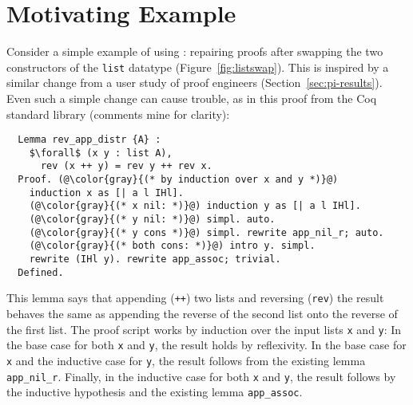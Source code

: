 \section{Motivating Example}
\label{sec:overview}

\begin{figure*}
\begin{minipage}{0.50\textwidth}
   
\end{minipage}
\hfill
\begin{minipage}{0.49\textwidth}
   
\end{minipage}
\caption{A change from the old version (left) to the new version (right) of \lstinline{list}.
Recall that \lstinline{list} is an inductive datatype that is either empty (the \lstinline{nil} constructor), or the result
of placing an element in front of another \lstinline{list} (the \lstinline{cons} constructor). The change swaps these
constructors ().}
\label{fig:listswap}
\end{figure*}

Consider a simple example of using \toolnamec: repairing proofs after swapping the two constructors of the \lstinline{list} datatype (Figure~\ref{fig:listswap}).
This is inspired by a similar change from a user study of proof engineers (Section~\ref{sec:pi-results}).
Even such a simple change can cause trouble, as in this proof from the Coq standard library (comments mine for clarity):

\begin{lstlisting}
  Lemma rev_app_distr {A} :
    $\forall$ (x y : list A),
      rev (x ++ y) = rev y ++ rev x.
  Proof. (@\color{gray}{(* by induction over x and y *)}@)
    induction x as [| a l IHl].
    (@\color{gray}{(* x nil: *)}@) induction y as [| a l IHl].
    (@\color{gray}{(* y nil: *)}@) simpl. auto.
    (@\color{gray}{(* y cons *)}@) simpl. rewrite app_nil_r; auto.
    (@\color{gray}{(* both cons: *)}@) intro y. simpl.
    rewrite (IHl y). rewrite app_assoc; trivial.
  Defined.
\end{lstlisting}
This lemma says that appending (\lstinline{++}) two lists and reversing (\lstinline{rev}) the result behaves the same as appending
the reverse of the second list onto the reverse of the first list.
The proof script works by induction over the input lists \lstinline{x} and \lstinline{y}:
In the base case for both \lstinline{x} and \lstinline{y}, the result holds by reflexivity.
In the base case for \lstinline{x} and the inductive case for \lstinline{y}, the result follows from the existing lemma \lstinline{app_nil_r}.
Finally, in the inductive case for both \lstinline{x} and \lstinline{y}, the result follows by the inductive hypothesis
and the existing lemma \lstinline{app_assoc}.

